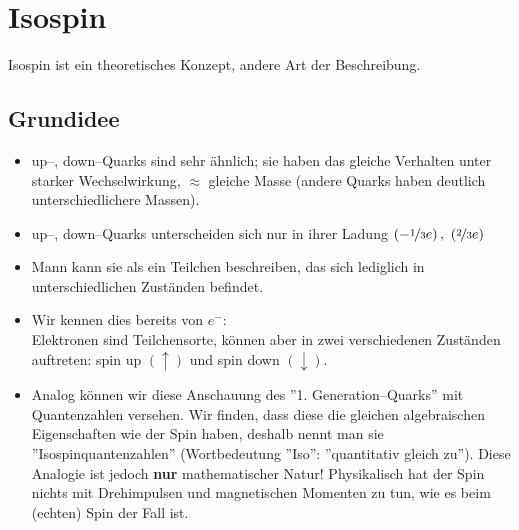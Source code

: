 \documentclass[Ex4_Zusammenfassung.tex]{subfiles}
\begin{document}
\section{Isospin}
Isospin ist ein theoretisches Konzept, andere Art der Beschreibung.
\subsection{Grundidee}
\begin{itemize}
	\item up--, down--Quarks sind sehr ähnlich; sie haben das gleiche Verhalten unter starker Wechselwirkung, $\approx$ gleiche Masse (andere Quarks haben deutlich unterschiedlichere Massen).
	\item up--, down--Quarks unterscheiden sich nur in ihrer Ladung $\left( - \nicefrac{1}{3}e\right),\ \left( \nicefrac{2}{3}e \right) $
	\item Mann kann sie als ein Teilchen beschreiben, das sich lediglich in unterschiedlichen Zuständen befindet.
	\item Wir kennen dies bereits von $e^-$: \\
	Elektronen sind Teilchensorte, können aber in zwei verschiedenen Zuständen auftreten: spin up $(\uparrow)$ und spin down $(\downarrow)$.
	\item Analog können wir diese Anschauung des ''1. Generation--Quarks'' mit Quantenzahlen versehen. Wir finden, dass diese die gleichen algebraischen Eigenschaften wie der Spin haben, deshalb nennt man sie ''Isospinquantenzahlen'' (Wortbedeutung ''Iso'': ''quantitativ gleich zu''). Diese Analogie ist jedoch \textbf{nur} mathematischer Natur! Physikalisch hat der Spin nichts mit Drehimpulsen und magnetischen Momenten zu tun, wie es beim (echten) Spin der Fall ist. 
\end{itemize}
\end{document}
